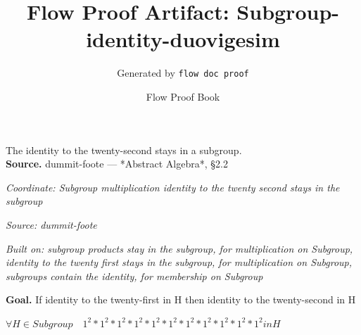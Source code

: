 \documentclass[11pt]{article}
\title{Flow Proof Artifact: Subgroup-identity-duovigesim}
\author{Generated by \texttt{flow doc proof}}
\date{Flow Proof Book}
\theoremstyle{definition}
\begin{document}
\maketitle
The identity to the twenty-second stays in a subgroup.\\[0.5em]
\textbf{Source.} dummit-foote — *Abstract Algebra*, §2.2\\[0.5em]
\bigskip
{}\par
\smallskip\noindent\textit{Coordinate: Subgroup \cdot multiplication \cdot identity to the twenty second stays in the subgroup}\par
\smallskip\noindent\textit{Source: dummit-foote}\par
\smallskip\noindent\textit{Built on: subgroup products stay in the subgroup, for multiplication on Subgroup, identity to the twenty first stays in the subgroup, for multiplication on Subgroup, subgroups contain the identity, for membership on Subgroup}\par
\medskip
\noindent\textbf{Goal.} If identity to the twenty-first in H then identity to the twenty-second in H\par
\noindent$\displaystyle \forall H \in Subgroup\quad 1^{2} * 1^{2} * 1^{2} * 1^{2} * 1^{2} * 1^{2} * 1^{2} * 1^{2} * 1^{2} * 1^{2} * 1^{2} in H$\par
\medskip
\noindent
\end{document}
